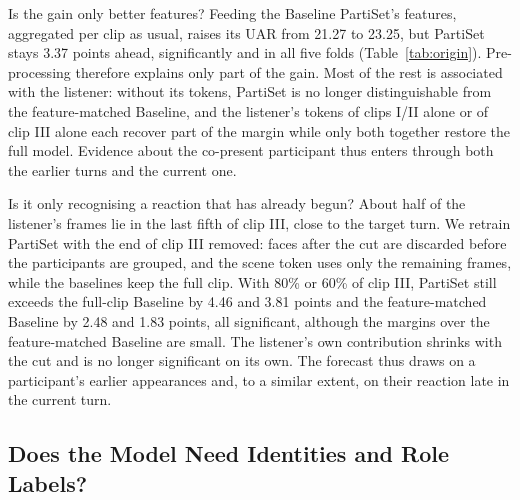 \documentclass[11pt]{article}
\newcommand{\model}{PartiSet}
\begin{document}
Is the gain only better features? Feeding the Baseline \model{}'s features, aggregated per clip as usual, raises its UAR
from 21.27 to 23.25, but \model{} stays 3.37 points ahead, significantly and in all five folds
(Table~\ref{tab:origin}). Pre-processing therefore explains only part of the gain. Most of the rest is associated with
the listener: without its tokens, \model{} is no longer distinguishable from the feature-matched Baseline, and the
listener's tokens of clips I/II alone or of clip III alone each recover part of the margin while only both together
restore the full model. Evidence about the co-present participant thus enters through both the earlier turns and the
current one.

Is it only recognising a reaction that has already begun? About half of the listener's frames lie in the last fifth of
clip III, close to the target turn. We retrain \model{} with the end of clip III removed: faces after the cut are
discarded before the participants are grouped, and the scene token uses only the remaining frames, while the baselines
keep the full clip. With 80\% or 60\% of clip III, \model{} still exceeds the full-clip Baseline by 4.46 and 3.81
points and the feature-matched Baseline by 2.48 and 1.83 points, all significant, although the margins over the
feature-matched Baseline are small. The listener's own contribution shrinks with the cut and is no longer
significant on its own. The forecast thus draws on a participant's earlier appearances and, to a similar extent, on
their reaction late in the current turn.

\subsection{Does the Model Need Identities and Role Labels?}
\label{sec:identity}
\end{document}
